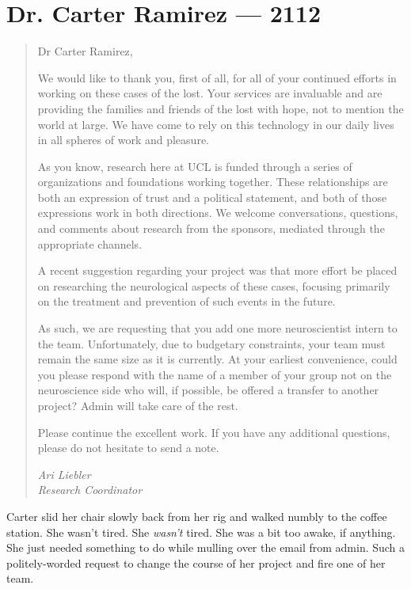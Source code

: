 \hypertarget{dr-carter-ramirez-2112}{%
\chapter*{Dr. Carter Ramirez — 2112}\label{dr-carter-ramirez-2112}}

\begin{quote}
Dr Carter Ramirez,

We would like to thank you, first of all, for all of your continued efforts in working on these cases of the lost. Your services are invaluable and are providing the families and friends of the lost with hope, not to mention the world at large. We have come to rely on this technology in our daily lives in all spheres of work and pleasure.

As you know, research here at UCL is funded through a series of organizations and foundations working together. These relationships are both an expression of trust and a political statement, and both of those expressions work in both directions. We welcome conversations, questions, and comments about research from the sponsors, mediated through the appropriate channels.

A recent suggestion regarding your project was that more effort be placed on researching the neurological aspects of these cases, focusing primarily on the treatment and prevention of such events in the future.

As such, we are requesting that you add one more neuroscientist intern to the team. Unfortunately, due to budgetary constraints, your team must remain the same size as it is currently. At your earliest convenience, could you please respond with the name of a member of your group not on the neuroscience side who will, if possible, be offered a transfer to another project? Admin will take care of the rest.

Please continue the excellent work. If you have any additional questions, please do not hesitate to send a note.

\emph{Ari Liebler}\\
\emph{Research Coordinator}
\end{quote}

Carter slid her chair slowly back from her rig and walked numbly to the coffee station. She wasn't tired. She \emph{wasn't} tired. She was a bit too awake, if anything. She just needed something to do while mulling over the email from admin. Such a politely-worded request to change the course of her project and fire one of her team.

